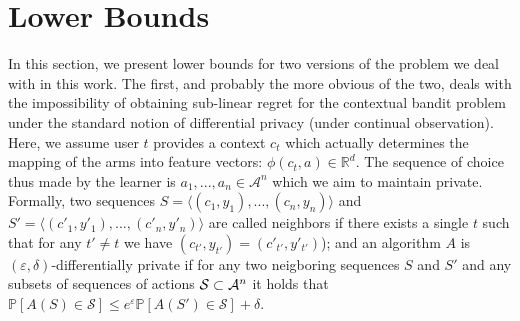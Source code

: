 \documentclass{article}
\newcommand{\Real}{\mathds{R}}
\renewcommand{\Pr}{\mathds{P}}
\newcommand{\A}{\mathcal{A}}
\begin{document}
\section{Lower Bounds}
\label{sec:lower_bounds}

In this section, we present lower bounds for two versions of the problem we deal with in this work. The first, and probably the more obvious of the two, deals with the impossibility of obtaining sub-linear regret for the contextual bandit problem under the standard notion of differential privacy (under continual observation). Here, we assume user $t$ provides a context $c_t$ which actually determines the mapping of the arms into feature vectors: $\phi(c_t, a) \in \Real^d$. The sequence of choice thus made by the learner is $a_1,..., a_n \in \A^n$ which we aim to maintain private. Formally, two sequences $S = \langle (c_1, y_1),..., (c_n,y_n)\rangle$ and $S' = \langle (c'_1, y'_1),..., (c'_n,y'_n)\rangle$ are called neighbors if there exists a single $t$ such that for any $t'\neq t$ we have $(c_{t'},y_{t'}) = (c'_{t'},y'_{t'})$); and an algorithm $A$ is $(\varepsilon,\delta)$-differentially private if for any two neigboring sequences $S$ and $S'$ and any subsets of sequences of actions ${\cal S}\subset \A^n$ it holds that $\Pr[A(S)\in\mathcal{S}] \leq e^\varepsilon \Pr[A(S')\in \mathcal{S}] +\delta$.
\end{document}
